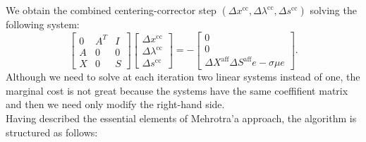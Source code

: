 \documentclass[a4paper,10 pt,titlepage,twoside]{book}
\theoremstyle{plain}
\theoremstyle{definition}
\theoremstyle{remark}
\begin{document}
We obtain the combined centering-corrector step $(\Delta x^{\text{cc}}, \Delta \lambda^{\text{cc}}, \Delta s^{\text{cc}})$ solving the following system:
\begin{equation}\label{(C)}
\begin{bmatrix}
0&A^{T}&I \\A&0&0\\X&0&S
\end{bmatrix}\begin{bmatrix}
\Delta x^{\text{cc}}\\\Delta\lambda^{\text{cc}} \\\Delta s^{\text{cc}}
\end{bmatrix}=-\begin{bmatrix}
0\\0\\\Delta X^{\text{aff}}\Delta S^{\text{aff}}e - \sigma\mu e
\end{bmatrix}.
\end{equation}
Although we need to solve at each iteration two linear systems instead of one, the marginal cost is not great because the systems have the same coeffifient matrix and then we need only modify the right-hand side. \\
 Having described the essential elements of Mehrotra'a approach, the algorithm is structured as follows:
\end{document}

